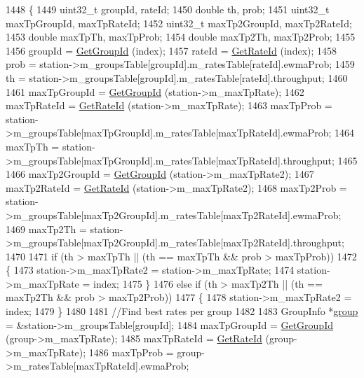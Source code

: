 \begin{DoxyCode}
1448 \{
1449   uint32\_t groupId, rateId;
1450   \textcolor{keywordtype}{double} th, prob;
1451   uint32\_t maxTpGroupId, maxTpRateId;
1452   uint32\_t maxTp2GroupId, maxTp2RateId;
1453   \textcolor{keywordtype}{double} maxTpTh, maxTpProb;
1454   \textcolor{keywordtype}{double} maxTp2Th, maxTp2Prob;
1455 
1456   groupId = \hyperlink{classns3_1_1MinstrelHtWifiManager_a43157e6007b4b922043cb02a99ea6d1f}{GetGroupId} (index);
1457   rateId = \hyperlink{classns3_1_1MinstrelHtWifiManager_a6162341f1348bbe713d09642b09ac658}{GetRateId} (index);
1458   prob = station->m\_groupsTable[groupId].m\_ratesTable[rateId].ewmaProb;
1459   th = station->m\_groupsTable[groupId].m\_ratesTable[rateId].throughput;
1460 
1461   maxTpGroupId = \hyperlink{classns3_1_1MinstrelHtWifiManager_a43157e6007b4b922043cb02a99ea6d1f}{GetGroupId} (station->m\_maxTpRate);
1462   maxTpRateId = \hyperlink{classns3_1_1MinstrelHtWifiManager_a6162341f1348bbe713d09642b09ac658}{GetRateId} (station->m\_maxTpRate);
1463   maxTpProb = station->m\_groupsTable[maxTpGroupId].m\_ratesTable[maxTpRateId].ewmaProb;
1464   maxTpTh = station->m\_groupsTable[maxTpGroupId].m\_ratesTable[maxTpRateId].throughput;
1465 
1466   maxTp2GroupId = \hyperlink{classns3_1_1MinstrelHtWifiManager_a43157e6007b4b922043cb02a99ea6d1f}{GetGroupId} (station->m\_maxTpRate2);
1467   maxTp2RateId = \hyperlink{classns3_1_1MinstrelHtWifiManager_a6162341f1348bbe713d09642b09ac658}{GetRateId} (station->m\_maxTpRate2);
1468   maxTp2Prob = station->m\_groupsTable[maxTp2GroupId].m\_ratesTable[maxTp2RateId].ewmaProb;
1469   maxTp2Th = station->m\_groupsTable[maxTp2GroupId].m\_ratesTable[maxTp2RateId].throughput;
1470 
1471   \textcolor{keywordflow}{if} (th > maxTpTh || (th == maxTpTh && prob > maxTpProb))
1472     \{
1473       station->m\_maxTpRate2 = station->m\_maxTpRate;
1474       station->m\_maxTpRate = index;
1475     \}
1476   \textcolor{keywordflow}{else} \textcolor{keywordflow}{if} (th > maxTp2Th || (th == maxTp2Th && prob > maxTp2Prob))
1477     \{
1478       station->m\_maxTpRate2 = index;
1479     \}
1480 
1481   \textcolor{comment}{//Find best rates per group}
1482 
1483   GroupInfo *\hyperlink{namespacevisualizer_1_1higcontainer_aa6ad2b76790275bfce7783429beaa23f}{group} = &station->m\_groupsTable[groupId];
1484   maxTpGroupId = \hyperlink{classns3_1_1MinstrelHtWifiManager_a43157e6007b4b922043cb02a99ea6d1f}{GetGroupId} (group->m\_maxTpRate);
1485   maxTpRateId = \hyperlink{classns3_1_1MinstrelHtWifiManager_a6162341f1348bbe713d09642b09ac658}{GetRateId} (group->m\_maxTpRate);
1486   maxTpProb = group->m\_ratesTable[maxTpRateId].ewmaProb;

\end{DoxyCode}
